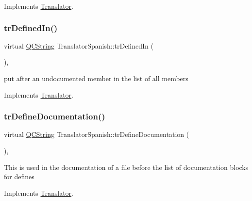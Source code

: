 Implements \mbox{\hyperlink{class_translator}{Translator}}.

\mbox{\label{class_translator_spanish_a44c4f1a0af36594c2ecb605bfbdd0eed}} 
\subsubsection{\texorpdfstring{trDefinedIn()}{trDefinedIn()}}
{\footnotesize\ttfamily virtual \mbox{\hyperlink{class_q_c_string}{Q\+C\+String}} Translator\+Spanish\+::tr\+Defined\+In (\begin{DoxyParamCaption}{ }\end{DoxyParamCaption})\hspace{0.3cm}{\ttfamily [inline]}, {\ttfamily [virtual]}}

put after an undocumented member in the list of all members 

Implements \mbox{\hyperlink{class_translator}{Translator}}.

\mbox{\label{class_translator_spanish_a81c7504672002f2176aa67c33fd0da59}} 
\subsubsection{\texorpdfstring{trDefineDocumentation()}{trDefineDocumentation()}}
{\footnotesize\ttfamily virtual \mbox{\hyperlink{class_q_c_string}{Q\+C\+String}} Translator\+Spanish\+::tr\+Define\+Documentation (\begin{DoxyParamCaption}{ }\end{DoxyParamCaption})\hspace{0.3cm}{\ttfamily [inline]}, {\ttfamily [virtual]}}

This is used in the documentation of a file before the list of documentation blocks for defines 

Implements \mbox{\hyperlink{class_translator}{Translator}}.

\mbox{\label{class_translator_spanish_a03c09a37c5b039e0c5630bcaff5c1588}} 
